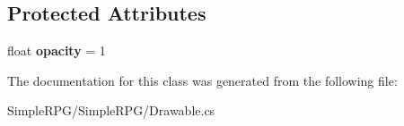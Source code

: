 \subsection*{Protected Attributes}
\begin{DoxyCompactItemize}
\item 
\hypertarget{class_simple_r_p_g_1_1_drawable_a7378ddf59da70427cd4315925a9273b3}{float {\bfseries opacity} = 1}\label{class_simple_r_p_g_1_1_drawable_a7378ddf59da70427cd4315925a9273b3}

\end{DoxyCompactItemize}


The documentation for this class was generated from the following file\-:\begin{DoxyCompactItemize}
\item 
Simple\-R\-P\-G/\-Simple\-R\-P\-G/Drawable.\-cs\end{DoxyCompactItemize}
